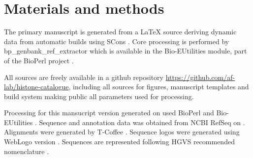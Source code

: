 \section{Materials and methods}
\label{sec:matmethods}

  The primary manuscript is generated from a \LaTeX{} source
  deriving dynamic data from automatic builds using SCons \citep{SCons2005}.
  Core processing is performed by bp\_genbank\_ref\_extractor
  which is available in the Bio-EUtilities module, part of the
  BioPerl project \citep{bioperl}.

  All sources are freely available in a github repository
  \url{https://github.com/af-lab/histone-catalogue}, including all
  sources for figures, manuscript templates and build system making public
  all parameters used for processing.

  Processing for this mansucript version generated on 
  used BioPerl \BioPerlVersion{} and Bio-EUtilities \BioEUtilitiesVersion{}.
  Sequence and annotation data was obtained from NCBI RefSeq \citep{PruittRefseq2014}
  on \printdate{\SequencesDate{}}.
  Alignments were generated by T-Coffee \TCoffeVersion{} \citep{tcoffee2000}.
  Sequence logos were generated using WebLogo version  \citep{weblogo}.
  Sequences are represented following HGVS recommended nomenclature \citep{mutnomenclature2003}.
